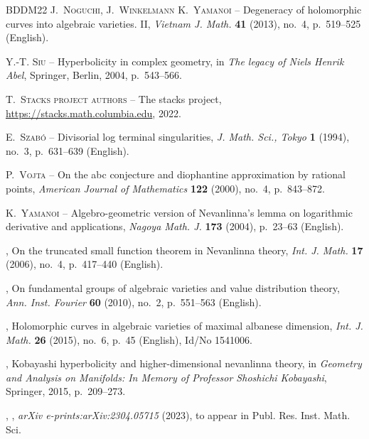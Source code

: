 \documentclass[11pt,english]{smfart}
\theoremstyle{plain}
\theoremstyle{definition}
\theoremstyle{remark}
\numberwithin{equation}{section}
\theoremstyle{plain}
\begin{document}
\begin{thebibliography}{BDDM22}
		{\scshape J.~Noguchi, J.~Winkelmann {\normalfont \smfandname} K.~Yamanoi} --
		{\og Degeneracy of holomorphic curves into algebraic varieties. {II}\fg},
		\emph{Vietnam J. Math.} \textbf{41} (2013), no.~4, p.~519--525 (English).
		
		{\scshape Y.-T. Siu} -- {\og Hyperbolicity in complex geometry\fg}, in
		\emph{The legacy of {N}iels {H}enrik {A}bel}, Springer, Berlin, 2004,
		p.~543--566.
		
		{\scshape T.~{Stacks project authors}} -- {\og The stacks project\fg},
		\url{https://stacks.math.columbia.edu}, 2022.
		
		{\scshape E.~Szab{\'o}} -- {\og Divisorial log terminal singularities\fg},
		\emph{J. Math. Sci., Tokyo} \textbf{1} (1994), no.~3, p.~631--639 (English).
		
		{\scshape P.~Vojta} -- {\og On the abc conjecture and diophantine approximation
			by rational points\fg}, \emph{American Journal of Mathematics} \textbf{122}
		(2000), no.~4, p.~843--872.
		
		{\scshape K.~Yamanoi} -- {\og Algebro-geometric version of {Nevanlinna}'s lemma
			on logarithmic derivative and applications\fg}, \emph{Nagoya Math. J.}
		\textbf{173} (2004), p.~23--63 (English).
		
		\bysame , {\og On the truncated small function theorem in {Nevanlinna}
			theory\fg}, \emph{Int. J. Math.} \textbf{17} (2006), no.~4, p.~417--440
		(English).
		
		\bysame , {\og On fundamental groups of algebraic varieties and value
			distribution theory\fg}, \emph{Ann. Inst. Fourier} \textbf{60} (2010), no.~2,
		p.~551--563 (English).
		
		\bysame , {\og Holomorphic curves in algebraic varieties of maximal albanese
			dimension\fg}, \emph{Int. J. Math.} \textbf{26} (2015), no.~6, p.~45
		(English), Id/No 1541006.
		
		\bysame , {\og Kobayashi hyperbolicity and higher-dimensional nevanlinna
			theory\fg}, in \emph{Geometry and Analysis on Manifolds: In Memory of
			Professor Shoshichi Kobayashi}, Springer, 2015, p.~209--273.
		
		\bysame , {\fg}, \emph{arXiv e-prints:arXiv:2304.05715} (2023),
		{to appear in Publ. Res. Inst. Math. Sci.}
		
	\end{thebibliography}
	
	
	
	
	
	
	
	
	
	
%	
%	
	
\end{document}
